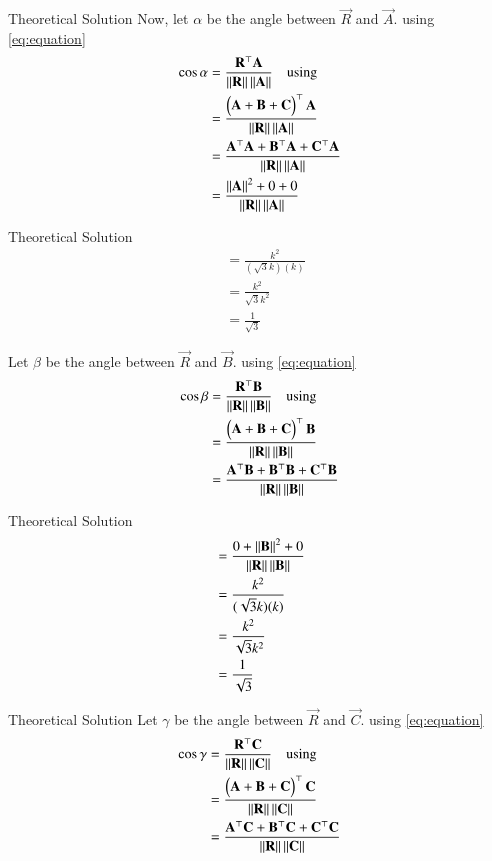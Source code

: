 \documentclass{beamer}
\begin{document}
\begin{frame}{Theoretical Solution}
Now, let $\alpha$ be the angle between $\vec{R}$ and $\vec{A}$. using \eqref{eq:equation}
\begin{align}
\cos \alpha &= \frac{\mathbf{R}^\top \mathbf{A}}{\left\lVert\mathbf{R}\right\rVert \left\lVert\mathbf{A}\right\rVert} \quad \text{using } \\
&= \frac{\begin{pmatrix}\mathbf{A} + \mathbf{B} + \mathbf{C}\end{pmatrix}^\top \mathbf{A}}{\left\lVert\mathbf{R}\right\rVert \left\lVert\mathbf{A}\right\rVert}   \\
&= \frac{\mathbf{A}^\top \mathbf{A} + \mathbf{B}^\top \mathbf{A} + \mathbf{C}^\top \mathbf{A}}{\left\lVert\mathbf{R}\right\rVert \left\lVert\mathbf{A}\right\rVert}   \\
&= \frac{\left\lVert\mathbf{A}\right\rVert^2 + 0 + 0}{\left\lVert\mathbf{R}\right\rVert \left\lVert\mathbf{A}\right\rVert}  
\end{align}
\end{frame}

\begin{frame}{Theoretical Solution}
\begin{align}
&= \frac{k^2}{(\sqrt{3}k)(k)}  \\
&= \frac{k^2}{\sqrt{3}k^2}  \\
&= \frac{1}{\sqrt{3}}
\end{align}

Let $\beta$ be the angle between $\vec{R}$ and $\vec{B}$. using \eqref{eq:equation}
\begin{align}
\cos \beta &= \frac{\mathbf{R}^\top \mathbf{B}}{\left\lVert\mathbf{R}\right\rVert \left\lVert\mathbf{B}\right\rVert} \quad \text{using }  \\
&= \frac{\begin{pmatrix}\mathbf{A} + \mathbf{B} + \mathbf{C}\end{pmatrix}^\top \mathbf{B}}{\left\lVert\mathbf{R}\right\rVert \left\lVert\mathbf{B}\right\rVert}   \\
&= \frac{\mathbf{A}^\top \mathbf{B} + \mathbf{B}^\top \mathbf{B} + \mathbf{C}^\top \mathbf{B}}{\left\lVert\mathbf{R}\right\rVert \left\lVert\mathbf{B}\right\rVert} 
\end{align}
\end{frame}

\begin{frame}{Theoretical Solution}
\begin{align}
&= \frac{0 + \left\lVert\mathbf{B}\right\rVert^2 + 0}{\left\lVert\mathbf{R}\right\rVert \left\lVert\mathbf{B}\right\rVert}   \\
&= \frac{k^2}{(\sqrt{3}k)(k)}   \\
&= \frac{k^2}{\sqrt{3}k^2}   \\
&= \frac{1}{\sqrt{3}}
\end{align}
\end{frame}

\begin{frame}{Theoretical Solution}
Let $\gamma$ be the angle between $\vec{R}$ and $\vec{C}$. using \eqref{eq:equation}
\begin{align}
\cos \gamma &= \frac{\mathbf{R}^\top \mathbf{C}}{\left\lVert\mathbf{R}\right\rVert \left\lVert\mathbf{C}\right\rVert} \quad \text{using } \\
&= \frac{\begin{pmatrix}\mathbf{A} + \mathbf{B} + \mathbf{C}\end{pmatrix}^\top \mathbf{C}}{\left\lVert\mathbf{R}\right\rVert \left\lVert\mathbf{C}\right\rVert}   \\
&= \frac{\mathbf{A}^\top \mathbf{C} + \mathbf{B}^\top \mathbf{C} + \mathbf{C}^\top \mathbf{C}}{\left\lVert\mathbf{R}\right\rVert \left\lVert\mathbf{C}\right\rVert}  
\end{align}
\end{frame}
\end{document}
